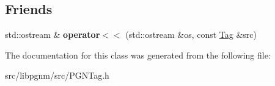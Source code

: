 \subsection*{Friends}
\begin{DoxyCompactItemize}
\item 
\hypertarget{classpgn_1_1Tag_a6ee8d45d1a415864a4c62c2fb4fcd80a}{
std::ostream \& {\bfseries operator$<$$<$} (std::ostream \&os, const \hyperlink{classpgn_1_1Tag}{Tag} \&src)}
\label{classpgn_1_1Tag_a6ee8d45d1a415864a4c62c2fb4fcd80a}

\end{DoxyCompactItemize}


The documentation for this class was generated from the following file:\begin{DoxyCompactItemize}
\item 
src/libpgnm/src/PGNTag.h\end{DoxyCompactItemize}
